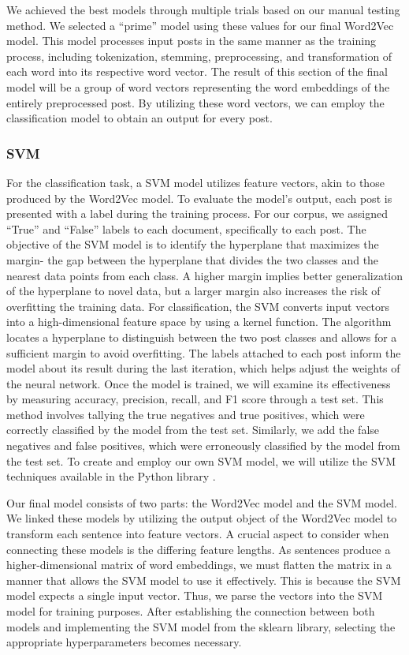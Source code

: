 \documentclass[english,bachelor]{swsLeipzig}
\begin{document}
We achieved the best models through multiple trials based on our manual testing method. We selected a ``prime'' model 
using these values for our final Word2Vec model. This model processes input posts in the same manner as the training process, including tokenization, stemming, preprocessing, and transformation of each word into its respective word vector. The result of this section of the final model will be a group of word vectors representing the word embeddings of the entirely preprocessed post. By utilizing these word vectors, we can employ the classification model to obtain an output for every post.

\subsubsection{SVM}
For the classification task, a SVM model utilizes feature vectors, akin to those produced by the Word2Vec model. To 
evaluate the model's output, each post is presented with a label during the training process. For our corpus, we assigned ``True'' and ``False'' labels to each document, specifically to each post. The objective of the SVM model is to identify the hyperplane that maximizes the margin- the gap between the hyperplane that divides the two classes and the nearest data points from each class. A higher margin implies better generalization of the hyperplane to novel data, but a larger margin also increases the risk of overfitting the training data. For classification, the SVM converts input vectors into a high-dimensional feature space by using a kernel function. The algorithm locates a hyperplane to distinguish between the two post classes and allows for a sufficient margin to avoid overfitting. The labels attached to each post inform the model about its result during the last iteration, which helps adjust the weights of the neural network. Once the model is trained, we will examine its effectiveness by measuring accuracy, precision, recall, and F1 score through a test set. This method involves tallying the true negatives and true positives, which were correctly classified by the model from the test set. Similarly, we add the false negatives and false positives, which were erroneously classified by the model from the test set. To create and employ our own SVM model, we will utilize the SVM techniques available in the Python library \citeauthor{scikit:svm}.

Our final model consists of two parts: the Word2Vec model and the SVM model. We linked these models by utilizing the 
output object of the Word2Vec model to transform each sentence into feature vectors. A crucial aspect to consider when connecting these models is the differing feature lengths. As sentences produce a higher-dimensional matrix of word embeddings, we must flatten the matrix in a manner that allows the SVM model to use it effectively. This is because the SVM model expects a single input vector. Thus, we parse the vectors into the SVM model for training purposes. After establishing the connection between both models and implementing the SVM model from the sklearn library, selecting the appropriate hyperparameters becomes necessary.
\end{document}
